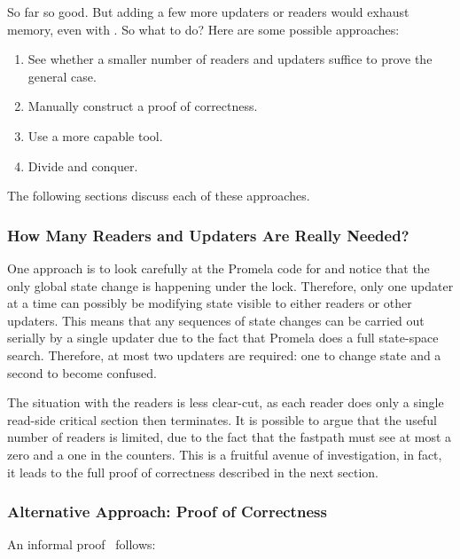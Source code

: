 So far so good.
But adding a few more updaters or readers would exhaust memory, even
with .
So what to do?
Here are some possible approaches:

\begin{enumerate}
\item	See whether a smaller number of readers and updaters suffice
	to prove the general case.
\item	Manually construct a proof of correctness.
\item	Use a more capable tool.
\item	Divide and conquer.
\end{enumerate}

The following sections discuss each of these approaches.

\subsubsection{How Many Readers and Updaters Are Really Needed?}
\label{sec:formal:How Many Readers and Updaters Are Really Needed?}

One approach is to look carefully at the Promela code for
 and notice that the only global state
change is happening under the lock.
Therefore, only one updater at a time can possibly be modifying
state visible to either readers or other updaters.
This means that any sequences of state changes can be carried
out serially by a single updater due to the fact that Promela does a full
state-space search.
Therefore, at most two updaters are required: one to change state
and a second to become confused.

The situation with the readers is less clear-cut, as each reader
does only a single read-side critical section then terminates.
It is possible to argue that the useful number of readers is limited,
due to the fact that the fastpath must see at most a zero and a one
in the counters.
This is a fruitful avenue of investigation, in fact, it leads to
the full proof of correctness described in the next section.

\subsubsection{Alternative Approach: Proof of Correctness}
\label{sec:formal:Alternative Approach: Proof of Correctness}

An informal proof~\cite{PaulMcKenney2007QRCUpatch}
follows:

